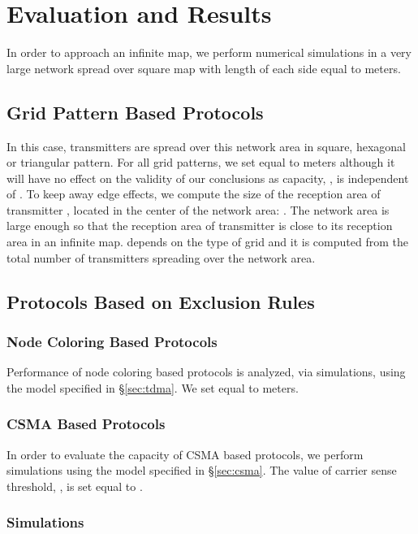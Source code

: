 \documentclass[12pt,english]{article}
\begin{document}
\section{Evaluation and Results}
\label{sec:simulations}

In order to approach an infinite map, we perform numerical simulations in a very large network spread over  square map with length of each side equal to  meters.

\subsection{Grid Pattern Based Protocols}

In this case, transmitters are spread over this network area in square, hexagonal or triangular pattern. For all grid patterns, we set  equal to  meters although it will have no effect on the validity of our conclusions as capacity, , is independent of . To keep away edge effects, we compute the size of the reception area of transmitter , located in the center of the network area: \mbox{}. The network area is large enough so that the reception area of transmitter  is close to its reception area in an infinite map.  depends on the type of grid and it is computed from the total number of transmitters spreading over the network area.

\subsection{Protocols Based on Exclusion Rules}

\subsubsection{Node Coloring Based Protocols}

Performance of node coloring based protocols is analyzed, via simulations, using the model specified in \S \ref{sec:tdma}. We set  equal to  meters. 

\subsubsection{CSMA Based Protocols}

In order to evaluate the capacity of CSMA based protocols, we perform simulations using the model specified in \S \ref{sec:csma}. The value of carrier sense threshold, , is set equal to .

\subsubsection{Simulations}
\end{document}
